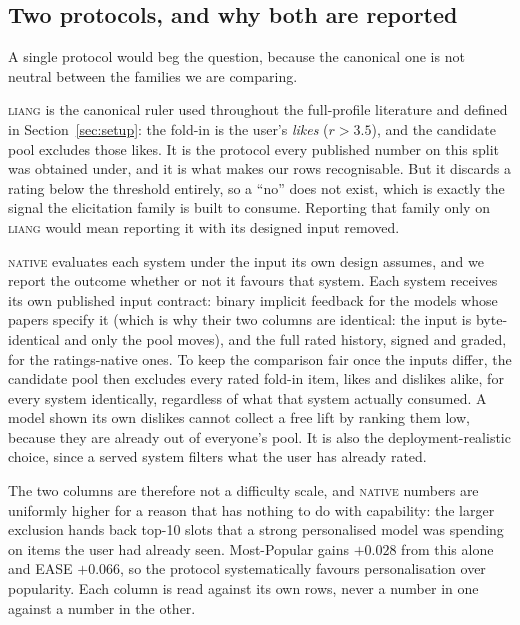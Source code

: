 \documentclass[acmsmall,review,anonymous]{acmart}
\begin{document}
\subsection{Two protocols, and why both are reported}\label{sec:protocols}
A single protocol would beg the question, because the canonical one is not neutral between the families we are comparing.

\textsc{liang} is the canonical ruler used throughout the full-profile literature and defined in Section~\ref{sec:setup}: the fold-in is the user's \emph{likes} ($r>3.5$), and the candidate pool excludes those likes. It is the protocol every published number on this split was obtained under, and it is what makes our rows recognisable. But it discards a rating below the threshold entirely, so a ``no'' does not exist, which is exactly the signal the elicitation family is built to consume. Reporting that family only on \textsc{liang} would mean reporting it with its designed input removed.

\textsc{native} evaluates each system under the input its own design assumes, and we report the outcome whether or not it favours that system. Each system receives its own published input contract: binary implicit feedback for the models whose papers specify it (which is why their two columns are identical: the input is byte-identical and only the pool moves), and the full rated history, signed and graded, for the ratings-native ones. To keep the comparison fair once the inputs differ, the candidate pool then excludes every rated fold-in item, likes and dislikes alike, for every system identically, regardless of what that system actually consumed. A model shown its own dislikes cannot collect a free lift by ranking them low, because they are already out of everyone's pool. It is also the deployment-realistic choice, since a served system filters what the user has already rated.

The two columns are therefore not a difficulty scale, and \textsc{native} numbers are uniformly higher for a reason that has nothing to do with capability: the larger exclusion hands back top-10 slots that a strong personalised model was spending on items the user had already seen. Most-Popular gains $+0.028$ from this alone and EASE $+0.066$, so the protocol systematically favours personalisation over popularity. Each column is read against its own rows, never a number in one against a number in the other.
\end{document}
